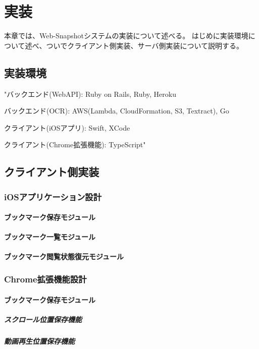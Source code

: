 \chapter{実装}
\label{chap:implementation}
本章では、Web-Snapshotシステムの実装について述べる。
はじめに実装環境について述べ、ついでクライアント側実装、サーバ側実装について説明する。

\section{実装環境}
"バックエンド(WebAPI): Ruby on Rails, Ruby, Heroku

バックエンド(OCR): AWS(Lambda, CloudFormation, S3, Textract), Go

クライアント(iOSアプリ): Swift, XCode

クライアント(Chrome拡張機能): TypeScript"

\section{クライアント側実装}
\subsection{iOSアプリケーション設計}
\subsubsection{ブックマーク保存モジュール}
\subsubsection{ブックマーク一覧モジュール}
\subsubsection{ブックマーク閲覧状態復元モジュール}

\subsection{Chrome拡張機能設計}
\subsubsection{ブックマーク保存モジュール}
\paragraph{スクロール位置保存機能}
\paragraph{動画再生位置保存機能}
